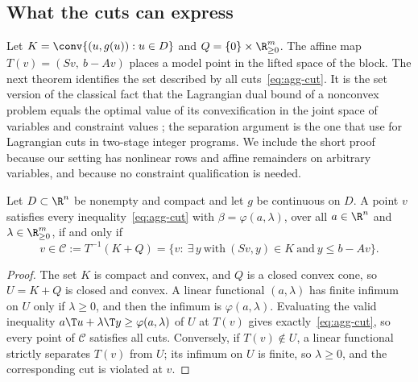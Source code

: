 \subsection{What the cuts can express}\label{sec:closure}

Let $K=\conv\{(u,g(u)):u\in D\}$ and $Q=\{0\}\times\R^m_{\ge0}$. The affine
map $T(v)=(Sv,\ b-Av)$ places a model point in the lifted space of the block.
The next theorem identifies the set described by all cuts~\eqref{eq:agg-cut}.
It is the set version of the classical fact that the Lagrangian dual bound of
a nonconvex problem equals the optimal value of its convexification in the
joint space of variables and constraint values
\citep{Falk1969,Geoffrion1974,FeltenmarkKiwiel2000,LemarechalRenaud2001}; the
separation argument is the one that \citet[Theorem~3]{ChenLuedtke2022} use
for Lagrangian cuts in two-stage integer programs. We include the short proof
because our setting has nonlinear rows and affine remainders on arbitrary
variables, and because no constraint qualification is needed.

\begin{theorem}\label{thm:closure}
Let $D\subset\R^n$ be nonempty and compact and let $g$ be continuous on $D$.
A point $v$ satisfies every inequality~\eqref{eq:agg-cut} with
$\beta=\varphi(a,\lambda)$, over all $a\in\R^n$ and $\lambda\in\R^m_{\ge0}$, if
and only if
\begin{equation}\label{eq:closure}
v\in\mathcal C:=T^{-1}(K+Q)=\bigl\{v:\ \exists\,y\ \text{with}\ (Sv,y)\in K\ \text{and}\ y\le b-Av\bigr\}.
\end{equation}
\end{theorem}

\begin{proof}
The set $K$ is compact and convex, and $Q$ is a closed convex cone, so
$U=K+Q$ is closed and convex. A linear functional $(a,\lambda)$ has finite
infimum on $U$ only if $\lambda\ge0$, and then the infimum is
$\varphi(a,\lambda)$. Evaluating the valid inequality
$a\T u+\lambda\T y\ge\varphi(a,\lambda)$ of $U$ at $T(v)$ gives
exactly~\eqref{eq:agg-cut}, so every point of $\mathcal C$ satisfies all cuts.
Conversely, if $T(v)\notin U$, a linear functional strictly separates $T(v)$
from $U$; its infimum on $U$ is finite, so $\lambda\ge0$, and the
corresponding cut is violated at $v$.
\end{proof}

